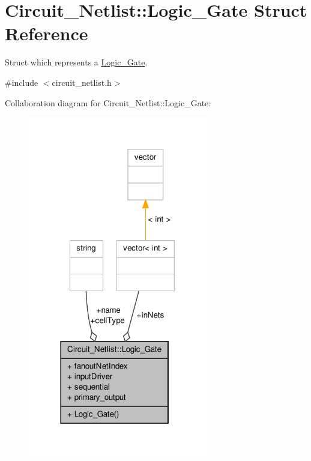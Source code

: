 \hypertarget{structCircuit__Netlist_1_1Logic__Gate}{\section{Circuit\-\_\-\-Netlist\-:\-:Logic\-\_\-\-Gate Struct Reference}
\label{structCircuit__Netlist_1_1Logic__Gate}
}


Struct which represents a \hyperlink{structCircuit__Netlist_1_1Logic__Gate}{Logic\-\_\-\-Gate}.  




{\ttfamily \#include $<$circuit\-\_\-netlist.\-h$>$}



Collaboration diagram for Circuit\-\_\-\-Netlist\-:\-:Logic\-\_\-\-Gate\-:\nopagebreak
\begin{figure}[H]
\begin{center}
\leavevmode
\includegraphics[width=222pt]{structCircuit__Netlist_1_1Logic__Gate__coll__graph}
\end{center}
\end{figure}
